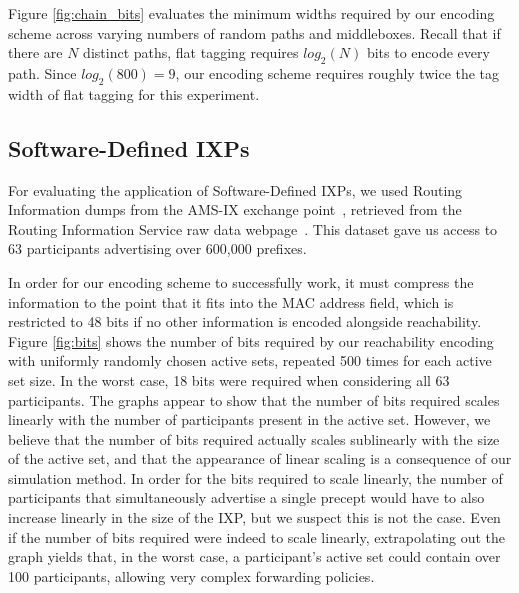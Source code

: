 Figure \ref{fig:chain_bits} evaluates the minimum widths required by our encoding scheme across varying numbers of random paths and middleboxes. Recall that if there are $N$ distinct paths, flat tagging requires $log_2(N)$ bits to encode every path. Since $log_2(800) = 9$, our encoding scheme requires roughly twice the tag width of flat tagging for this experiment. 


\subsection{Software-Defined IXPs}
For evaluating the application of Software-Defined IXPs, we used Routing Information dumps from the AMS-IX exchange point~\cite{ams-ix}, retrieved from the Routing Information Service raw data webpage~\cite{ris}. This dataset gave us access to 63 participants advertising over 600,000 prefixes. 

In order for our encoding scheme to successfully work, it must compress the information to the point that it fits into the MAC address field, which is restricted to 48 bits if no other information is encoded alongside reachability. Figure \ref{fig:bits} shows the number of bits required by our reachability encoding with uniformly randomly chosen active sets, repeated 500 times for each active set size. In the worst case, 18 bits were required when considering all 63 participants. The graphs appear to show that the number of bits required scales linearly with the number of participants present in the active set. However, we believe that the number of bits required actually scales sublinearly with the size of the active set, and that the appearance of linear scaling is a consequence of our simulation method. In order for the bits required to scale linearly, the number of participants that simultaneously advertise a single precept would have to also increase linearly in the size of the IXP, but we suspect this is not the case. Even if the number of bits required were indeed to scale linearly, extrapolating out the graph yields that, in the worst case, a participant's active set could contain over 100 participants, allowing very complex forwarding policies.



